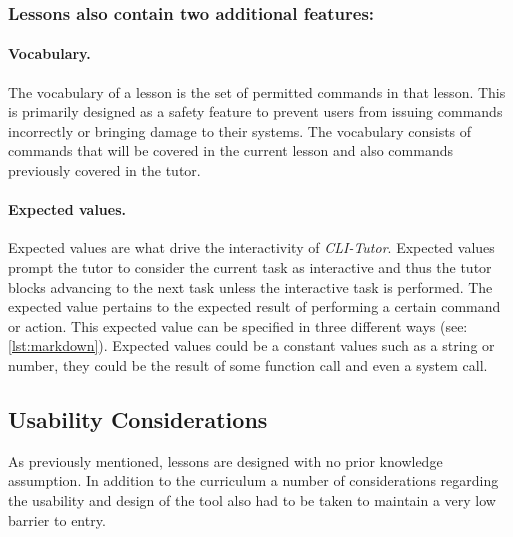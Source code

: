 \subsubsection{Lessons also contain two additional features:}

\paragraph{Vocabulary.}  The vocabulary of a lesson is the set of permitted
commands in that lesson. This is primarily designed as a safety feature to
prevent users from issuing commands incorrectly or bringing damage to their
systems. The vocabulary consists of commands that will be covered in the
current lesson and also commands previously covered in the tutor.

\paragraph{Expected values.} Expected values are what drive the interactivity
of \textit{CLI-Tutor}. Expected values prompt the tutor to consider the current
task as interactive and thus the tutor blocks advancing to the next task unless
the interactive task is performed. The expected value pertains to the expected
result of performing a certain command or action. This expected value can be
specified in three different ways (see: \autoref{lst:markdown}). Expected values could be a constant values such
as a string or number, they could be the result of some function call and even
a system call.

\subsection{Usability Considerations}

As previously mentioned, lessons are designed with no prior knowledge
assumption. In addition to the curriculum a number of considerations regarding
the usability and design of the tool also had to be taken to maintain a very
low barrier to entry.

